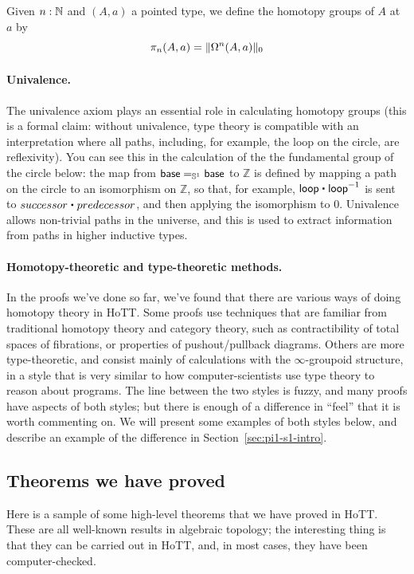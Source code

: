 \begin{defn}
  Given $n:\N$ and $(A,a)$ a pointed type, we define the homotopy groups of $A$
  at $a$ by
  \[\pi_n(A,a)=\trunc0{\Omega^n(A,a)}\]
\end{defn}

\paragraph{Univalence.}  The univalence axiom plays an essential role in
  calculating homotopy groups (this is a formal claim: without
  univalence, type theory is compatible with an interpretation where all
  paths, including, for example, the loop on the circle, are reflexivity).  You
  can see this in the calculation of the the fundamental group of the
  circle below: the map from $\id[\Sn ^1] \base \base$ to $\mathbb{Z}$
  is defined by mapping a path on the circle to an isomorphism on
  $\mathbb{Z}$, so that, for example, $\lloop \ct \opp \lloop$ is sent
  to $successor \ct predecessor$, and then applying the isomorphism to
  0. Univalence allows non-trivial paths in the universe, and this is
  used to extract information from paths in higher inductive types.

\paragraph{Homotopy-theoretic and type-theoretic methods.}  In the
proofs we've done so far, we've found that there are various ways of
doing homotopy theory in HoTT.  Some proofs use techniques that are
familiar from traditional homotopy theory and category theory, such as
contractibility of total spaces of fibrations, or properties of
pushout/pullback diagrams.  Others are more type-theoretic, and consist
mainly of calculations with the $\infty$-groupoid structure, in a style
that is very similar to how computer-scientists use type theory to
reason about programs.  The line between the two styles is fuzzy, and
many proofs have aspects of both styles; but there is enough of a
difference in ``feel'' that it is worth commenting on.  We will present
some examples of both styles below, and describe an example of the
difference in Section~\ref{sec:pi1-s1-intro}.

\subsection{Theorems we have proved}

Here is a sample of some high-level theorems that we have proved in
HoTT.  These are all well-known results in algebraic topology; the
interesting thing is that they can be carried out in HoTT, and, in most
cases, they have been computer-checked.

